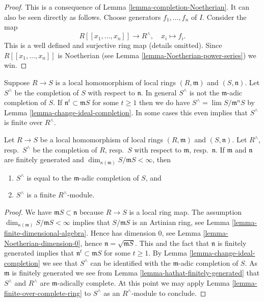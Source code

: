 \begin{proof}
This is a consequence of
Lemma \ref{lemma-completion-Noetherian}.
It can also be seen directly as follows.
Choose generators $f_1, \ldots, f_n$ of $I$.
Consider the map
$$
R[[x_1, \ldots, x_n]] \longrightarrow R^\wedge,
\quad
x_i \longmapsto f_i.
$$
This is a well defined and surjective ring map
(details omitted).
Since $R[[x_1, \ldots, x_n]]$ is Noetherian (see
Lemma \ref{lemma-Noetherian-power-series}) we win.
\end{proof}

\noindent
Suppose $R \to S$ is a local homomorphism of local rings $(R, \mathfrak m)$
and $(S, \mathfrak n)$. Let $S^\wedge$ be the completion
of $S$ with respect to $\mathfrak n$. In general $S^\wedge$ is not
the $\mathfrak m$-adic completion of $S$. If
$\mathfrak n^t \subset \mathfrak mS$ for some $t \geq 1$
then we do have $S^\wedge = \lim S/\mathfrak m^nS$ by
Lemma \ref{lemma-change-ideal-completion}. In some cases this even
implies that $S^\wedge$ is finite over $R^\wedge$.

\begin{lemma}
\label{lemma-finite-after-completion}
Let $R \to S$ be a local homomorphism of local rings $(R, \mathfrak m)$
and $(S, \mathfrak n)$. Let $R^\wedge$, resp.\ $S^\wedge$ be the completion
of $R$, resp.\ $S$ with respect to $\mathfrak m$, resp.\ $\mathfrak n$.
If $\mathfrak m$ and $\mathfrak n$ are finitely generated and
$\dim_{\kappa(\mathfrak m)} S/\mathfrak mS < \infty$, then
\begin{enumerate}
\item $S^\wedge$ is equal to the $\mathfrak m$-adic completion of $S$, and
\item $S^\wedge$ is a finite $R^\wedge$-module.
\end{enumerate}
\end{lemma}

\begin{proof}
We have $\mathfrak mS \subset \mathfrak n$ because $R \to S$ is a local
ring map.
The assumption $\dim_{\kappa(\mathfrak m)} S/\mathfrak mS < \infty$
implies that $S/\mathfrak mS$ is an Artinian ring, see
Lemma \ref{lemma-finite-dimensional-algebra}.
Hence has dimension $0$, see
Lemma \ref{lemma-Noetherian-dimension-0},
hence $\mathfrak n = \sqrt{\mathfrak mS}$.
This and the fact that $\mathfrak n$ is finitely generated
implies that $\mathfrak n^t \subset \mathfrak mS$ for
some $t \geq 1$. By
Lemma \ref{lemma-change-ideal-completion}
we see that $S^\wedge$ can be identified with the $\mathfrak m$-adic
completion of $S$. As $\mathfrak m$ is finitely generated we see from
Lemma \ref{lemma-hathat-finitely-generated}
that $S^\wedge$ and $R^\wedge$ are $\mathfrak m$-adically complete.
At this point we may apply
Lemma \ref{lemma-finite-over-complete-ring}
to $S^\wedge$ as an $R^\wedge$-module to conclude.
\end{proof}


